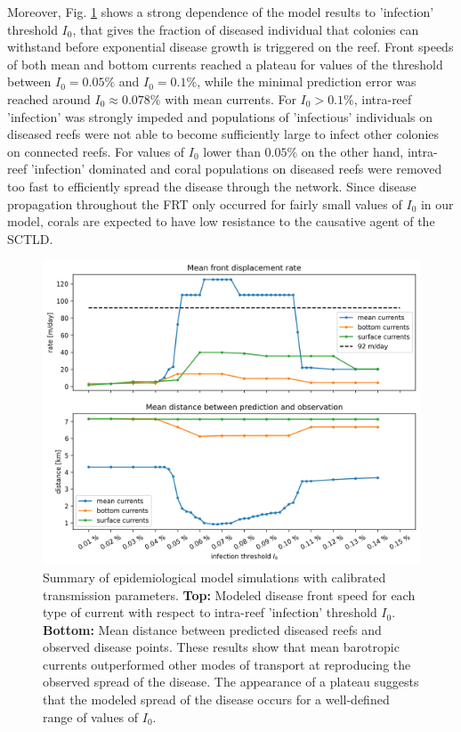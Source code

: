 Moreover, Fig. \ref{fig:results} shows a strong dependence of the model results to 'infection' threshold $I_0$, that gives the fraction of diseased individual that colonies can withstand before exponential disease growth is triggered on the reef. Front speeds of both mean and bottom currents reached a plateau for values of the threshold between $I_0=0.05\%$ and $I_0=0.1\%$, while the minimal prediction error was reached around $I_0 \approx 0.078\%$ with mean currents. For $I_0 > 0.1\%$, intra-reef 'infection' was strongly impeded and populations of 'infectious' individuals on diseased reefs were not able to become sufficiently large to infect other colonies on connected reefs. For values of $I_0$ lower than $0.05\%$ on the other hand, intra-reef 'infection' dominated and coral populations on diseased reefs were removed too fast to efficiently spread the disease through the network. Since disease propagation throughout the FRT only occurred for fairly small values of $I_0$ in our model, corals are expected to have low resistance to the causative agent of the SCTLD. 

\begin{figure}
    \centering
    \includegraphics[width=.8\textwidth]{chapters/sctld/figures/sctld_validation_corrected.jpg}
    \caption{Summary of epidemiological model simulations with calibrated transmission parameters. \textbf{Top:} Modeled disease front speed for each type of current with respect to intra-reef 'infection' threshold $I_0$. \textbf{Bottom:} Mean distance between predicted diseased reefs and observed disease points. These results show that mean barotropic currents outperformed other modes of transport at reproducing the observed spread of the disease. The appearance of a plateau suggests that the modeled spread of the disease occurs for a well-defined range of values of $I_0$.}
    \label{fig:results}
\end{figure}

